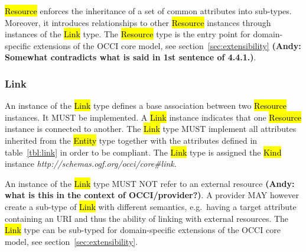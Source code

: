 \documentclass[10pt,a4paper]{article}
\begin{document}

\hl{Resource} enforces the inheritance of a set of common attributes into
sub-types. Moreover, it introduces relationships to other \hl{Resource}
instances through instances of the \hl{Link} type.
%
The \hl{Resource} type is the entry point for domain-specific extensions of the
OCCI core model, see section~\ref{sec:extensibility} 
\textbf{(Andy: Somewhat contradicts what is said in 1st sentence of 4.4.1.)}.

\subsubsection{Link}
\label{sec:link}
An instance of the \hl{Link} type defines a base association between two
\hl{Resource} instances. It MUST be implemented. A \hl{Link} instance indicates
that one \hl{Resource} instance is connected to another.
%
The \hl{Link} type MUST implement all attributes inherited from the
\hl{Entity} type together with the attributes defined in table~\ref{tbl:link}
in order to be compliant.
%
The \hl{Link} type is assigned the \hl{Kind} instance
\textit{http://schemas.ogf.org/occi/core\#link}.


An instance of the \hl{Link} type MUST NOT refer to an external resource
\textbf{(Andy: what is this in the context of OCCI/provider?)}.  A
provider MAY however create a sub-type of \hl{Link} with different semantics,
e.g.~having a target attribute containing an URI and thus the ability of linking
with external resources.
%
The \hl{Link} type can be sub-typed for domain-specific extensions of the
OCCI core model, see section~\ref{sec:extensibility}.
\end{document}
